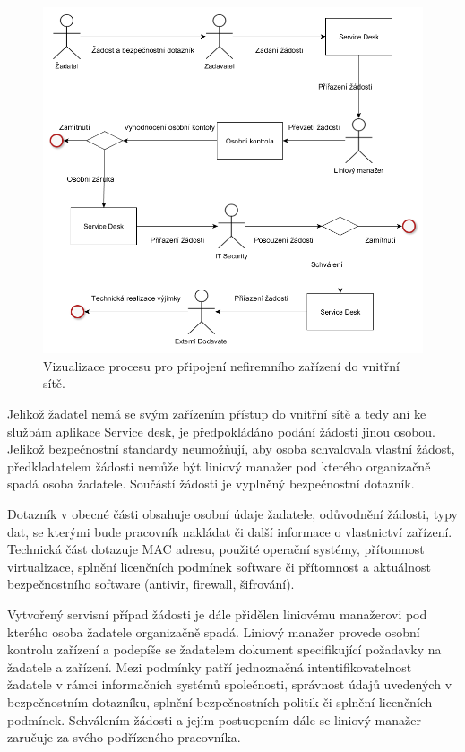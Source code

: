 \begin{figure}[h!]
\centering
\includegraphics[width=13cm]{img/vyjimka}
\caption{Vizualizace procesu pro připojení nefiremního zařízení do vnitřní sítě.\label{vyjimka}} 
\end{figure}

Jelikož žadatel nemá se svým zařízením přístup do vnitřní sítě a tedy ani ke službám aplikace Service desk, je předpokládáno podání žádosti jinou osobou. Jelikož bezpečnostní standardy neumožňují, aby osoba schvalovala vlastní žádost, předkladatelem žádosti nemůže být liniový manažer pod kterého organizačně spadá osoba žadatele. Součástí žádosti je vyplněný bezpečnostní dotazník. 

Dotazník v obecné části obsahuje osobní údaje žadatele, odůvodnění žádosti, typy dat, se kterými bude pracovník nakládat či další informace o vlastnictví zařízení. Technická část dotazuje MAC adresu, použité operační systémy, přítomnost virtualizace, splnění licenčních podmínek software či přítomnost a aktuálnost bezpečnostního software (antivir, firewall, šifrování).

Vytvořený servisní případ žádosti je dále přidělen liniovému manažerovi pod kterého osoba žadatele organizačně spadá. Liniový manažer provede osobní kontrolu zařízení a podepíše se žadatelem dokument specifikující požadavky na žadatele a zařízení. Mezi podmínky patří jednoznačná intentifikovatelnost žadatele v rámci informačních systémů společnosti, správnost údajů uvedených v bezpečnostním dotazníku, splnění bezpečnostních politik či splnění licenčních podmínek. Schválením žádosti a jejím postuopením dále se liniový manažer zaručuje za svého podřízeného pracovníka.

